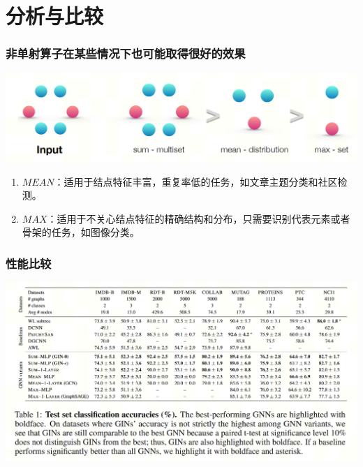 \documentclass{beamer}
\begin{document}
\section{分析与比较}

\begin{frame}

  \frametitle{非单射算子在某些情况下也可能取得很好的效果}
  \includegraphics[scale=0.3]{figs/other.png}
  \begin{enumerate}
    \item $MEAN$：适用于结点特征丰富，重复率低的任务，如文章主题分类和社区检测。
    \item $MAX$：适用于不关心结点特征的精确结构和分布，只需要识别代表元素或者骨架的任务，如图像分类。
  \end{enumerate}

\end{frame}

\begin{frame}

  \frametitle{性能比较}
  \includegraphics[scale=0.25]{figs/test.png}

\end{frame}
\end{document}
